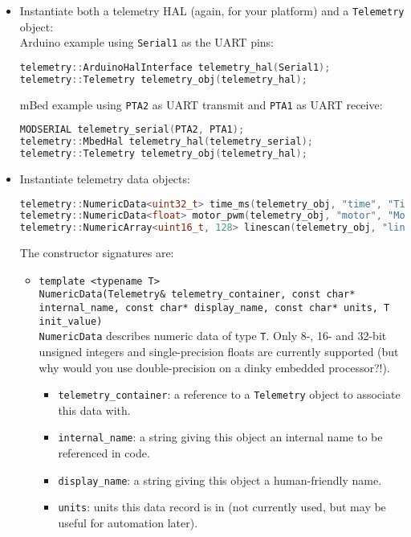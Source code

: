 \documentclass[11pt]{article}
\begin{document}
\begin{itemize}
  \item Instantiate both a telemetry HAL (again, for your platform) and a \texttt{Telemetry} object: \\
  Arduino example using \texttt{Serial1} as the UART pins:
  \begin{lstlisting}[language=C++]
telemetry::ArduinoHalInterface telemetry_hal(Serial1);
telemetry::Telemetry telemetry_obj(telemetry_hal);
  \end{lstlisting}  
  mBed example using \texttt{PTA2} as UART transmit and \texttt{PTA1} as UART receive:
  \begin{lstlisting}[language=C++]
MODSERIAL telemetry_serial(PTA2, PTA1);
telemetry::MbedHal telemetry_hal(telemetry_serial);
telemetry::Telemetry telemetry_obj(telemetry_hal);
  \end{lstlisting}
  \item Instantiate telemetry data objects:
  \begin{lstlisting}[language=C++]
telemetry::NumericData<uint32_t> time_ms(telemetry_obj, "time", "Time", "ms", 0);
telemetry::NumericData<float> motor_pwm(telemetry_obj, "motor", "Motor PWM", "\%DC", 0);
telemetry::NumericArray<uint16_t, 128> linescan(telemetry_obj, "linescan", "Linescan", "ADC", 0);  
  \end{lstlisting}
  The constructor signatures are:
  \begin{itemize}
    \item \texttt{template <typename T>\\ NumericData(Telemetry\& telemetry\_container, const char* internal\_name, const char* display\_name, const char* units, T init\_value)} \\
    \texttt{NumericData} describes numeric data of type \texttt{T}. Only 8-, 16- and 32-bit unsigned integers and single-precision floats are currently supported (but why would you use double-precision on a dinky embedded processor?!).
    \begin{itemize}
      \item \texttt{telemetry\_container}: a reference to a \texttt{Telemetry} object to associate this data with.
      \item \texttt{internal\_name}: a string giving this object an internal name to be referenced in code.
      \item \texttt{display\_name}: a string giving this object a human-friendly name.
      \item \texttt{units}: units this data record is in (not currently used, but may be useful for automation later).

\end{itemize}
\end{itemize}
\end{itemize}
\end{document}
